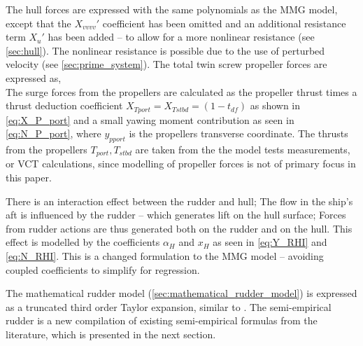 The hull forces are expressed with the same polynomials as the MMG model, except that the ${X_{vvvv}}'$ coefficient has been omitted and an additional resistance term ${X_u}'$ has been added -- to allow for a more nonlinear resistance (see \autoref{sec:hull}). The nonlinear resistance is possible due to the use of perturbed velocity (see \autoref{sec:prime_system}).
The total twin screw propeller forces are expressed as,
\begin{equation}
    \label{eq:X_P}
    
\end{equation}
%
\begin{equation}
    \label{eq:Y_P}
    
\end{equation}
%
\begin{equation}
    \label{eq:N_P}
    
\end{equation}
The surge forces from the propellers are calculated as the propeller thrust times a thrust deduction coefficient $X_{Tport}=X_{Tstbd}=(1-t_{df})$ as shown in \autoref{eq:X_P_port} and a small yawing moment contribution as seen in \autoref{eq:N_P_port}, where $y_{pport}$ is the propellers transverse coordinate. The thrusts from the propellers $T_{port},T_{stbd}$ are taken from the the model tests measurements, or VCT calculations, since modelling of propeller forces is not of primary focus in this paper.
\begin{equation}
    \label{eq:X_P_port}
    
\end{equation}
\begin{equation}
    \label{eq:N_P_port}
    
\end{equation}

There is an interaction effect between the rudder and hull; The flow in the ship's aft is influenced by the rudder -- which generates lift on the hull surface; Forces from rudder actions are thus generated both on the rudder and on the hull. This effect is modelled by the coefficients $\alpha_H$ and $x_H$ as seen in \autoref{eq:Y_RHI} and \autoref{eq:N_RHI}. This is a changed formulation to the MMG model -- avoiding coupled coefficients to simplify for regression.
\begin{equation}
    \label{eq:Y_RHI}
    
\end{equation}
%
\begin{equation}
    \label{eq:N_RHI}
    
\end{equation}

The mathematical rudder model (\autoref{sec:mathematical_rudder_model}) is expressed as a truncated third order Taylor expansion, similar to \citet{abkowitz_ship_1964}. 
The semi-empirical rudder is a new compilation of existing semi-empirical formulas from the literature, which is presented in the next section.
